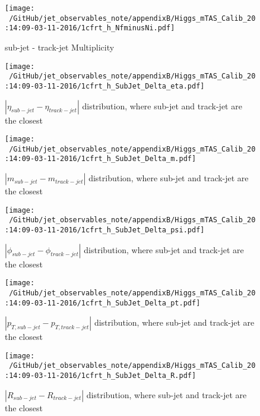 \begin{figure}
 
\texttt{[image: ~/GitHub/jet\_observables\_note/appendixB/Higgs\_mTAS\_Calib\_20:14:09-03-11-2016/1cfrt\_h\_NfminusNi.pdf]}
\caption{sub-jet - track-jet Multiplicity}
 
\end{figure}

\clearpage %

\begin{figure}
 
\texttt{[image: ~/GitHub/jet\_observables\_note/appendixB/Higgs\_mTAS\_Calib\_20:14:09-03-11-2016/1cfrt\_h\_SubJet\_Delta\_eta.pdf]}
\caption{$| \eta_{sub-jet} - \eta_{track-jet} | $ distribution, where sub-jet and track-jet are the closest}
 
\end{figure}
 
\begin{figure}
 
\texttt{[image: ~/GitHub/jet\_observables\_note/appendixB/Higgs\_mTAS\_Calib\_20:14:09-03-11-2016/1cfrt\_h\_SubJet\_Delta\_m.pdf]}
\caption{$| m_{sub-jet} - m_{track-jet} |$ distribution, where sub-jet and track-jet are the closest}
 
\end{figure}
 
\begin{figure}
 
\texttt{[image: ~/GitHub/jet\_observables\_note/appendixB/Higgs\_mTAS\_Calib\_20:14:09-03-11-2016/1cfrt\_h\_SubJet\_Delta\_psi.pdf]}
\caption{$| \phi_{sub-jet} - \phi_{track-jet} | $ distribution, where sub-jet and track-jet are the closest}
 
\end{figure}
\begin{figure}
 
\texttt{[image: ~/GitHub/jet\_observables\_note/appendixB/Higgs\_mTAS\_Calib\_20:14:09-03-11-2016/1cfrt\_h\_SubJet\_Delta\_pt.pdf]}
\caption{$| p_{T,sub-jet} - p_{T,track-jet} | $ distribution, where sub-jet and track-jet are the closest}
 
\end{figure}
 
\begin{figure}
 
\texttt{[image: ~/GitHub/jet\_observables\_note/appendixB/Higgs\_mTAS\_Calib\_20:14:09-03-11-2016/1cfrt\_h\_SubJet\_Delta\_R.pdf]}
\caption{$| R_{sub-jet} - R_{track-jet} | $ distribution, where sub-jet and track-jet are the closest}
 
\end{figure}
 

